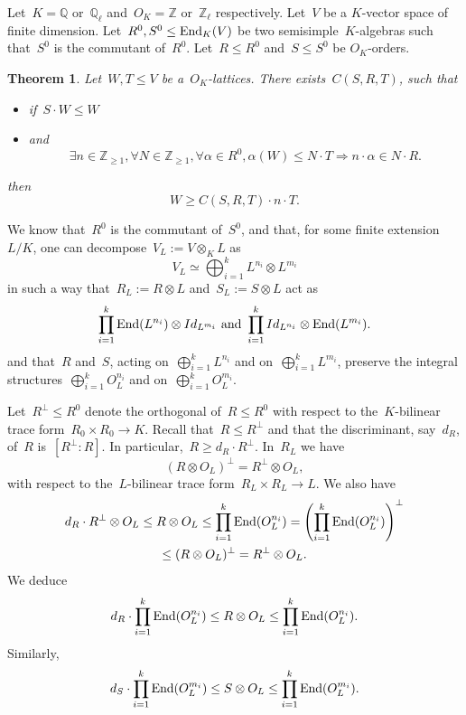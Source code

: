 \documentclass[12pt]{amsart}
\newtheorem{theorem}{Theorem}[section]
\newcommand{\End}{{\rm End}}
\newcommand{\Z}{{\mathbb Z}}
\newcommand{\Q}{{\mathbb Q}}
\newcommand{\tens}{\otimes}
\begin{document}
Let~$K=\Q$ or~$\Q_\ell$ and~$O_K=\Z$ or~$\Z_\ell$ respectively.
Let~$V$ be a $K$-vector space of finite dimension. 
Let~$R^0,S^0\leq \End_K(V)$ be two semisimple~$K$-algebras such that~$S^0$ is the commutant of~$R^0$. Let~$R\leq R^0$ and~$S\leq S^0$ be $O_K$-orders. 

\begin{theorem}\label{thm:D1}
Let~$W,T\leq V$ be a~$O_K$-lattices.
There exists~$C(S,R,T)$, such that
\begin{itemize}
\item if~$S\cdot W\leq W$
\item and 
\begin{equation}\label{eq:D1hyp}
\exists n\in \Z_{\geq1}, \forall N\in\Z_{\geq1},
\forall \alpha \in R^0, 
\alpha(W)\leq N\cdot T\Rightarrow n\cdot \alpha \in N\cdot R.
\end{equation}
\end{itemize}
then 
\[
W\geq C(S,R,T)\cdot n\cdot T.
\]
\end{theorem}


We know that~$R^0$ is the commutant of~$S^0$, and that, for some finite extension~$L/K$, 
one can decompose~$V_L:=V\tens_K L$ as
\[
V_L\simeq \bigoplus_{i=1}^k L^{n_i}\tens L^{m_i}
\]
in such a way that~$R_L:=R\tens L$ and~$S_L:=S\tens L$ act as
\[
\prod_{i=1}^k \End(L^{n_i})\tens Id_{L^{m_i}}\text{ and }
\prod_{i=1}^k  Id_{L^{n_i}} \tens \End(L^{m_i}).
\]
and that~$R$ and~$S$, acting on~$ \bigoplus_{i=1}^k L^{n_i}$ and on~$\bigoplus_{i=1}^k L^{m_i}$,
preserve the integral structures~$ \bigoplus_{i=1}^k O_L^{n_i}$ and on~$\bigoplus_{i=1}^k O_L^{m_i}$.

Let~$R^\bot\leq R^0$ denote the orthogonal of~$R\leq R^0$ with respect to the~$K$-bilinear trace form~$R_0\times R_0\to K$.
Recall that~$R\leq R^\bot$ and that the discriminant, say~$d_R$, of~$R$ is~$[R^\bot:R]$. In particular,~$R\geq d_R\cdot R^\bot$. In~$R_L$ we have
\[
(R\tens O_L)^\bot=R^\bot\tens O_L,
\]
with respect to the~$L$-bilinear trace form~$R_L\times R_L\to L$. We also have
\begin{multline}
d_R\cdot R^\bot\tens O_L
\leq R\tens O_L\leq \prod^k_{i=1}\End(O_L^{n_i})=\left(\prod^k_{i=1}\End(O_L^{n_i})\right)^\bot
\\
\leq (R\tens O_L)^\bot = R^\bot\tens O_L.
\end{multline}
We deduce
\begin{equation}\label{eq:b}
d_R\cdot \prod^k_{i=1}\End(O_L^{n_i})\leq  R\tens O_L\leq \prod^k_{i=1}\End(O_L^{n_i}).
\end{equation}
Similarly,
\[
d_S\cdot \prod^k_{i=1}\End(O_L^{m_i})\leq  S\tens O_L\leq \prod^k_{i=1}\End(O_L^{m_i}).
\]
\end{document}
